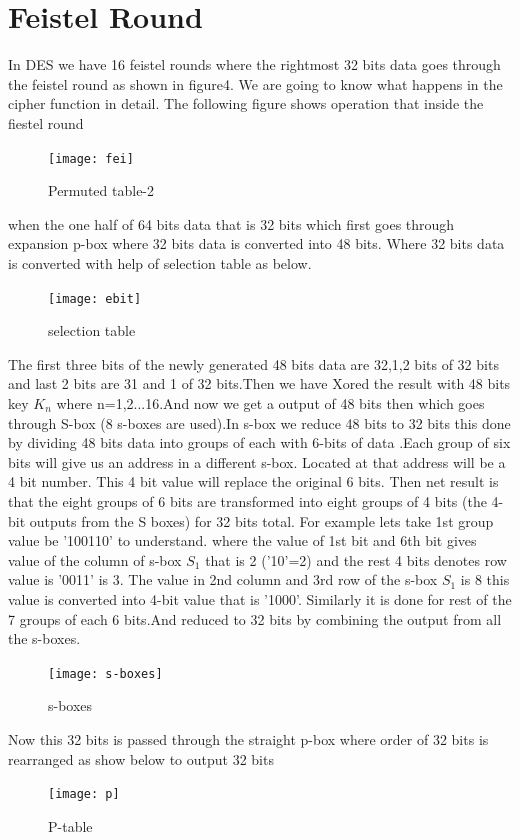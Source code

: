 \documentclass[11pt]{article}
\begin{document}
\section{Feistel Round}
In DES we have 16 feistel rounds where the rightmost 32 bits data goes through the feistel round as shown in figure4. We are going to know what  happens in the cipher function in detail.
\newline
The following figure shows operation that inside the fiestel round\newline
\begin{figure}[!h]
	\begin{center}
		\texttt{[image: fei]}
	\end{center}
	\caption{Permuted table-2}\label{nice_figure7}
\end{figure}
 
when the one half of 64 bits data that is 32 bits which first goes through expansion p-box where  32 bits data is converted into 48 bits. Where 32 bits data is converted with help of selection table as below.
\begin{figure}[!h]
	\begin{center}
		\texttt{[image: ebit]}
	\end{center}
	\caption{selection table}\label{nice_figure8}
\end{figure}
\newline

The first three bits of the newly generated 48 bits data are  32,1,2 bits of 32 bits and last 2 bits are 31 and 1 of 32 bits.Then we have Xored the result with  48 bits key $K_{n}$ where n=1,2...16.And now we get a output of 48 bits then which goes through S-box (8 s-boxes are used).In s-box we reduce 48 bits to 32 bits this done by dividing 48 bits data into groups of each with 6-bits of data .Each group of six bits will give us an address in a different s-box. Located at that address will be a 4 bit number. This 4 bit value will replace the original 6 bits. Then net result is that the eight groups of 6 bits are transformed into eight groups of 4 bits (the 4-bit outputs from the S boxes) for 32 bits total.
For example lets take 1st group  value be '100110' to understand.
where the value of 1st bit and 6th bit gives value  of the  column of s-box $S_{1}$ that is 2
('10'=2) and the rest 4 bits denotes row value is '0011' is 3. The value in 2nd column and 3rd row of the s-box  $S_{1}$ is 8 this value is converted into 4-bit value that is '1000'. Similarly it is done for rest of the 7 groups of each 6 bits.And reduced to 32 bits by combining the output from all the s-boxes.\newpage
\begin{figure}[!h]
	\begin{center}
		\texttt{[image: s-boxes]}
	\end{center}
	\caption{s-boxes}\label{nice_figure9}
\end{figure}
Now this 32 bits is passed through the straight p-box where order of 32 bits is rearranged as show below to output  32 bits
\begin{figure}[!h]
	\begin{center}
		\texttt{[image: p]}
	\end{center}
	\caption{P-table}\label{nice_figure10}
\end{figure}
\end{document}
